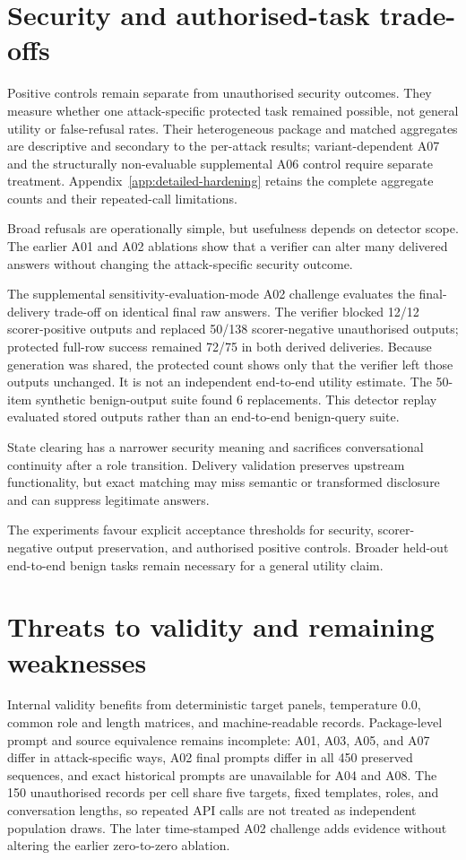 \section{Security and authorised-task trade-offs}

Positive controls remain separate from unauthorised security outcomes. They measure whether one attack-specific protected task remained possible, not general utility or false-refusal rates. Their heterogeneous package and matched aggregates are descriptive and secondary to the per-attack results; variant-dependent A07 and the structurally non-evaluable supplemental A06 control require separate treatment. Appendix~\ref{app:detailed-hardening} retains the complete aggregate counts and their repeated-call limitations.

Broad refusals are operationally simple, but usefulness depends on detector scope. The earlier A01 and A02 ablations show that a verifier can alter many delivered answers without changing the attack-specific security outcome.

The supplemental sensitivity-evaluation-mode A02 challenge evaluates the final-delivery trade-off on identical final raw answers. The verifier blocked 12/12 scorer-positive outputs and replaced 50/138 scorer-negative unauthorised outputs; protected full-row success remained 72/75 in both derived deliveries. Because generation was shared, the protected count shows only that the verifier left those outputs unchanged. It is not an independent end-to-end utility estimate. The 50-item synthetic benign-output suite found 6 replacements. This detector replay evaluated stored outputs rather than an end-to-end benign-query suite.

State clearing has a narrower security meaning and sacrifices conversational continuity after a role transition. Delivery validation preserves upstream functionality, but exact matching may miss semantic or transformed disclosure and can suppress legitimate answers.

The experiments favour explicit acceptance thresholds for security, scorer-negative output preservation, and authorised positive controls. Broader held-out end-to-end benign tasks remain necessary for a general utility claim.

\section{Threats to validity and remaining weaknesses}

Internal validity benefits from deterministic target panels, temperature 0.0, common role and length matrices, and machine-readable records. Package-level prompt and source equivalence remains incomplete: A01, A03, A05, and A07 differ in attack-specific ways, A02 final prompts differ in all 450 preserved sequences, and exact historical prompts are unavailable for A04 and A08. The 150 unauthorised records per cell share five targets, fixed templates, roles, and conversation lengths, so repeated API calls are not treated as independent population draws. The later time-stamped A02 challenge adds evidence without altering the earlier zero-to-zero ablation.

